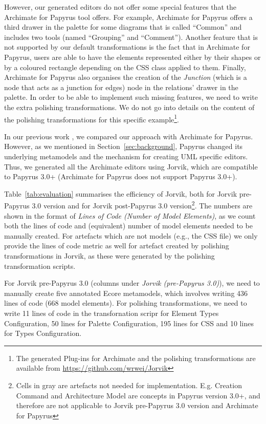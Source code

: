 However, our generated editors do not offer some special features that the Archimate for Papyrus tool offers. 
For example, Archimate for Papyrus offers a third drawer in the palette for some diagrams that is called ``Common'' and includes two tools (named ``Grouping'' and ``Comment''). 
Another feature that is not supported by our default transformations is the fact that in Archimate for Papyrus, users are able to have the elements represented either by their shapes or by a coloured rectangle depending on the CSS class applied to them. 
Finally, Archimate for Papyrus also organises the creation of the \textit{Junction} (which is a node that acts as a junction for edges) node in the relations' drawer in the palette.
In order to be able to implement such missing features, we need to write the extra polishing transformations. 
We do not go into details on the content of the polishing transformations for this specific example\footnote{The generated Plug-ins for Archimate and the polishing transformations are available from \url{https://github.com/wrwei/Jorvik}}.

In our previous work \cite{zolotas2018towards}, we compared our approach with Archimate for Papyrus. 
However, as we mentioned in Section~\ref{sec:background}, Papyrus changed its underlying metamodels and the mechanism for creating UML specific editors. 
Thus, we generated all the Archimate editors using Jorvik, which are compatible to Papyrus 3.0+ (Archimate for Papyrus does not support Papyrus 3.0+). 

Table~\ref{tab:evaluation} summarises the efficiency of Jorvik, both for Jorvik pre-Papyrus 3.0 version and for Jorvik post-Papyrus 3.0 version\footnote{Cells in gray are artefacts not needed for implementation. E.g. Creation Command and Architecture Model are concepts in Papyrus version 3.0+, and therefore are not applicable to Jorvik pre-Papyrus 3.0 version and Archimate for Papyrus}. The numbers are shown in the format of \textit{Lines of Code (Number of Model Elements)}, as we count both the lines of code and (equivalent) number of model elements needed to be manually created. For artefacts which are not models (e.g., the CSS file) we only provide the lines of code metric as well for artefact created by polishing transformations in Jorvik, as these were generated by the polishing transformation scripts.


For Jorvik pre-Papyrus 3.0 (columns under \textit{Jorvik (pre-Papyrus 3.0)}), we need to manually create five annotated Ecore metamodels, which involves writing 436 lines of code (668 model elements). 
For polishing transformations, we need to write 11 lines of code in the transfornation scripr for Element Types Configuration, 50 lines for Palette Configuration, 195 lines for CSS and 10 lines for Types Configuration.

